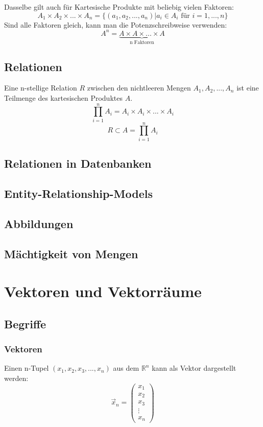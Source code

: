 \begin{comment} %
Dasselbe gilt auch für Kartesische Produkte mit drei Faktoren:
\[ A \times B \times C = \{(a,b,c)|a \in A, b \in B, c \in C \}\]
\end{comment}

Dasselbe gilt auch für Kartesische Produkte mit beliebig vielen Faktoren:
\[ A_1 \times A_2 \times ... \times A_n = \{(a_1,a_2,...,a_n)|a_i \in
A_i \text{ für } i = 1, ..., n \}\]
Sind alle Faktoren gleich, kann man die Potenzschreibweise verwenden:
\[ A^n = \underbrace{A \times A \times ... \times A}_{\text{n Faktoren}} \]

\subsection{Relationen}
Eine n-stellige Relation $R$ zwischen den nichtleeren Mengen $A_1, A_2,
..., A_n$ ist eine Teilmenge des kartesischen Produktes $A$.
\[ \prod \limits_{i=1}^{n}A_i = A_i \times A_i \times ...  \times A_i \]
\[ R \subset A = \prod \limits_{i=1}^{n}A_i \]

\subsection{Relationen in Datenbanken}
\subsection{Entity-Relationship-Models}
\subsection{Abbildungen}
\subsection{Mächtigkeit von Mengen}

\section{Vektoren und Vektorräume}

\subsection{Begriffe}
\subsubsection{Vektoren}
Einen n-Tupel $(x_1, x_2, x_3, ..., x_n)$ aus dem $\mathbb{R}^n$ kann
als Vektor dargestellt werden:
\[ \vec x_n = \left(
    \begin {array} {c}
        x_1 \\
        x_2 \\
        x_3 \\
        \vdots \\
        x_n
    \end {array}
  \right) \]

